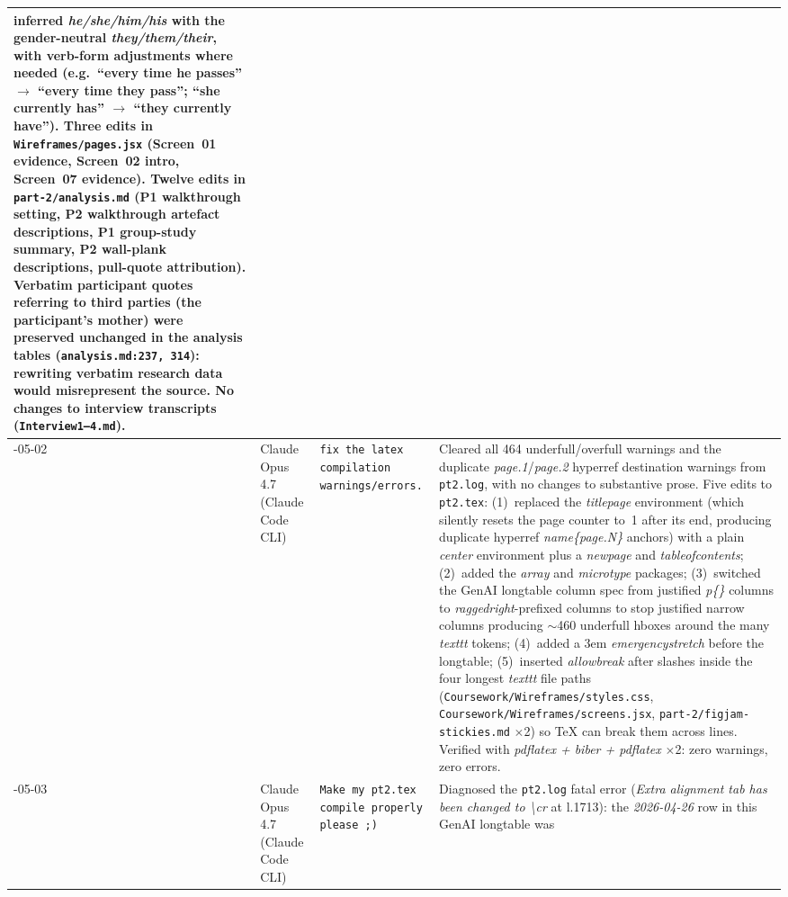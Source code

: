 \documentclass[a4paper,11pt]{article}
\begin{document}
\begin{longtable}{@{}>{\raggedright\arraybackslash}p{1.8cm}>{\raggedright\arraybackslash}p{2.8cm}>{\raggedright\arraybackslash}p{4.5cm}>{\raggedright\arraybackslash}p{4.5cm}@{}}
  inferred \emph{he/she/him/his} with the gender-neutral
  \emph{they/them/their}, with verb-form adjustments where needed
  (e.g.\ ``every time he passes'' $\to$ ``every time they pass'';
  ``she currently has'' $\to$ ``they currently have''). Three
  edits in \texttt{Wireframes/pages.jsx} (Screen~01 evidence,
  Screen~02 intro, Screen~07 evidence). Twelve edits in
  \texttt{part-2/analysis.md} (P1 walkthrough setting, P2
  walkthrough artefact descriptions, P1 group-study summary, P2
  wall-plank descriptions, pull-quote attribution). Verbatim
  participant quotes referring to third parties (the participant's
  mother) were preserved unchanged in the analysis tables
  (\texttt{analysis.md:237, 314}): rewriting verbatim research
  data would misrepresent the source. No changes to interview
  transcripts (\texttt{Interview1--4.md}). \\
\midrule
2026-05-02
& Claude Opus 4.7 (Claude Code CLI)
& \texttt{fix the latex compilation warnings/errors.}
& Cleared all 464 underfull/overfull warnings and the duplicate
  \emph{page.1}/\emph{page.2} hyperref destination warnings from
  \texttt{pt2.log}, with no changes to substantive prose. Five
  edits to \texttt{pt2.tex}: (1)~replaced the \emph{titlepage}
  environment (which silently resets the page counter to~1 after
  its end, producing duplicate hyperref \emph{name\{page.N\}}
  anchors) with a plain \emph{center} environment plus a
  \emph{newpage} and \emph{tableofcontents}; (2)~added the
  \emph{array} and \emph{microtype} packages; (3)~switched the
  GenAI longtable column spec from justified \emph{p\{\}} columns
  to \emph{raggedright}-prefixed columns to stop justified narrow
  columns producing $\sim$460 underfull hboxes around the many
  \emph{texttt} tokens; (4)~added a 3em \emph{emergencystretch}
  before the longtable; (5)~inserted \emph{allowbreak} after
  slashes inside the four longest \emph{texttt} file paths
  (\texttt{Coursework/\allowbreak Wireframes/\allowbreak styles.css},
  \texttt{Coursework/\allowbreak Wireframes/\allowbreak screens.jsx},
  \texttt{part-2/\allowbreak figjam-stickies.md} $\times$2) so TeX
  can break them across lines. Verified with \emph{pdflatex +
  biber + pdflatex} $\times$2: zero warnings, zero errors. \\
\midrule
2026-05-03
& Claude Opus 4.7 (Claude Code CLI)
& \texttt{Make my pt2.tex compile properly please ;)}
& Diagnosed the \texttt{pt2.log} fatal error
  (\emph{Extra alignment tab has been changed to \textbackslash cr} at
  l.1713): the \emph{2026-04-26} row in this GenAI longtable was

\end{longtable}
\end{document}
